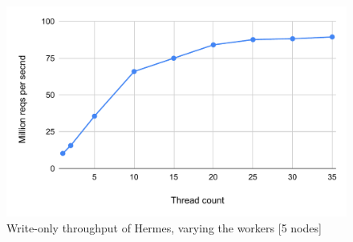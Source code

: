 \begin{figure}[t]
  \centering
  \includegraphics[scale=0.4]{1_figures/Hr-scal.pdf}
  \caption{Write-only throughput of Hermes, varying the workers [5 nodes]}
  \label{fig:hr-scal}
\end{figure}